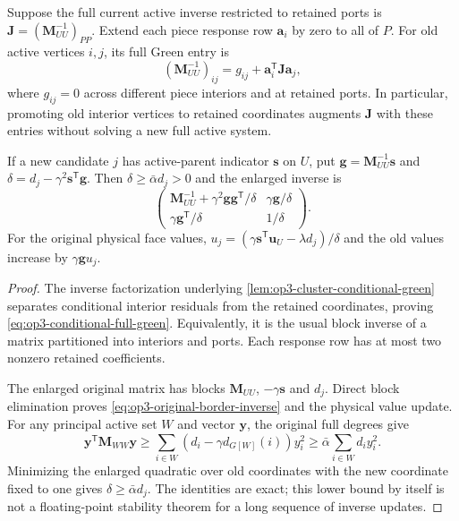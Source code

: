 \begin{lemma}
\label{lem:op3-green-promotion-border}
Suppose the full current active inverse restricted to retained ports is
$\boldsymbol J=(\boldsymbol M_{UU}^{-1})_{PP}$.
Extend each piece response row $\boldsymbol a_i$ by zero to all of $P$.
For old active vertices $i,j$, its full Green entry is
\begin{equation}
 (\boldsymbol M_{UU}^{-1})_{ij}
   =g_{ij}+\boldsymbol a_i^{\mathsf T}\boldsymbol J\boldsymbol a_j,
 \label{eq:op3-conditional-full-green}
\end{equation}
where $g_{ij}=0$ across different piece interiors and at retained ports.
In particular, promoting old interior vertices to retained coordinates
augments $\boldsymbol J$ with these entries without solving a new full
active system.

If a new candidate $j$ has active-parent indicator $\boldsymbol s$ on $U$,
put $\boldsymbol g=\boldsymbol M_{UU}^{-1}\boldsymbol s$ and
$\delta=d_j-\gamma^2\boldsymbol s^{\mathsf T}\boldsymbol g$.
Then $\delta\geq\bar\alpha d_j>0$ and the enlarged inverse is
\begin{equation}
 \begin{pmatrix}
  \boldsymbol M_{UU}^{-1}+\gamma^2\boldsymbol g\boldsymbol g^{\mathsf T}/\delta
       &\gamma\boldsymbol g/\delta\\
  \gamma\boldsymbol g^{\mathsf T}/\delta&1/\delta
 \end{pmatrix}.
 \label{eq:op3-original-border-inverse}
\end{equation}
For the original physical face values,
$u_j=(\gamma\boldsymbol s^{\mathsf T}\boldsymbol u_U-\lambda d_j)/\delta$
and the old values increase by $\gamma\boldsymbol g u_j$.
\end{lemma}
\begin{proof}
The inverse factorization underlying
\cref{lem:op3-cluster-conditional-green} separates conditional interior
residuals from the retained coordinates, proving
\eqref{eq:op3-conditional-full-green}. Equivalently, it is the usual block
inverse of a matrix partitioned into interiors and ports. Each response
row has at most two nonzero retained coefficients.

The enlarged original matrix has blocks
$\boldsymbol M_{UU}$, $-\gamma\boldsymbol s$ and $d_j$.
Direct block elimination proves \eqref{eq:op3-original-border-inverse}
and the physical value update. For any principal active set $W$ and vector
$\boldsymbol y$, the original full degrees give
\[
 \boldsymbol y^{\mathsf T}\boldsymbol M_{WW}\boldsymbol y
 \geq \sum_{i\in W}(d_i-\gamma d_{G[W]}(i))y_i^2
 \geq\bar\alpha\sum_{i\in W}d_i y_i^2.
\]
Minimizing the enlarged quadratic over old coordinates with the new
coordinate fixed to one gives $\delta\geq\bar\alpha d_j$.
The identities are exact; this lower bound by itself is not a floating-point
stability theorem for a long sequence of inverse updates.
\end{proof}

